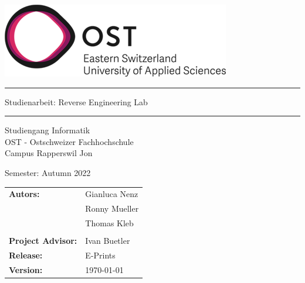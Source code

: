 \begin{titlepage}

    \begin{center}

        \includegraphics[height=0.15\textwidth, right]{resources/ost-logo.png}

        \vspace{1 cm}

        \par\noindent\rule{\textwidth}{0.6pt}

        \vspace{0.5cm}

        {\Huge Studienarbeit: Reverse Engineering Lab}

        \vspace{0.5cm}

        \par\noindent\rule{\textwidth}{0.6pt}

        \vspace{1 cm}

        Studiengang Informatik \\
        OST - Ostschweizer Fachhochschule \\
        Campus Rapperswil Jon \\

        \vspace{1 cm}

        Semester: Autumn 2022

        \vspace{1 cm}
        
        \begin{table}[h!]
            \centering
            \begin{tabular}{@{}ll}
                \textbf{Autors:}    & Gianluca Nenz \\
                                          & Ronny Mueller \\
                                          & Thomas Kleb \\
                                          &                    \\
                \textbf{Project Advisor:} & Ivan Buetler \\
                \textbf{Release:} & E-Prints \\
                \textbf{Version:} & \today
            \end{tabular}
        \end{table}
        


\end{center}
\end{titlepage}

